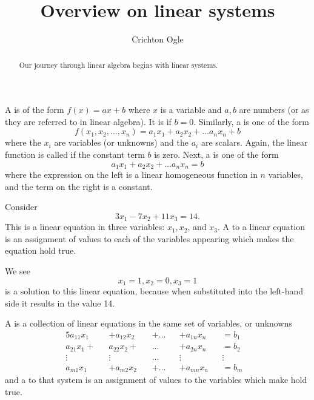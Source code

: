 \documentclass{ximera}
\title{Overview on linear systems}
\author{Crichton Ogle}
\begin{document}
\begin{abstract}
  Our journey through linear algebra begins with linear systems.
\end{abstract}

\maketitle


\begin{definition}
  A  is of the form $f(x) = ax+b$ where $x$ is a variable and $a,b$ are numbers (or  as they are referred to in linear algebra). It is  if $b=0$. Similarly, a  is one of the form
  \[
    f(x_1,x_2,\dots,x_n) = a_1x_1 + a_2x_2 + \dots a_nx_n + b
  \]
  where the $x_i$ are variables (or unknowns) and the $a_i$ are scalars. Again, the linear function is called  if the constant term $b$ is zero. Next, a  is one of the form
  \[
    a_1x_1 + a_2x_2 + \dots a_nx_n =  b
  \]
  where the expression on the left is a linear homogeneous function in $n$ variables, and the term on the right is a constant.
\end{definition}

\begin{example}
  Consider
  \begin{equation}
    3x_1 - 7x_2 + 11x_3 = 14.
  \end{equation}
  This is a linear equation in three variables: $x_1, x_2$, and
  $x_3$. A  to a linear equation is an assignment of
  values to each of the variables appearing which makes the equation
  hold true.

  We see
  \[
    x_1 = 1, x_2 = 0, x_3 = 1
  \]
  is a solution to this linear equation, because when substituted into the left-hand side it results in the value 14.
\end{example}

\begin{definition}
  A  is a collection of linear equations in the same set of variables, or unknowns
  \begin{alignat*}{5}\tag{2}\label{eqn:sys}
    a_{11}x_1 &&+ a_{12}x_2 && + {}\ldots{} && + a_{1n}x_n && =  b_1 &\\
    a_{21}x_1 + && a_{22}x_2 + &&  {}\ldots{} && + a_{2n}x_n &&  = b_2 &\\
    \vdots &&  \vdots &&  {}\ldots{} &&  \vdots &&   \vdots &\\
    a_{m1}x_1 &&+ a_{m2}x_2 && + {}\ldots{} && + a_{mn}x_n && =  b_m &
  \end{alignat*}
  and a  to that system is an assignment of values to the variables which make  hold true.
\end{definition}
\end{document}
